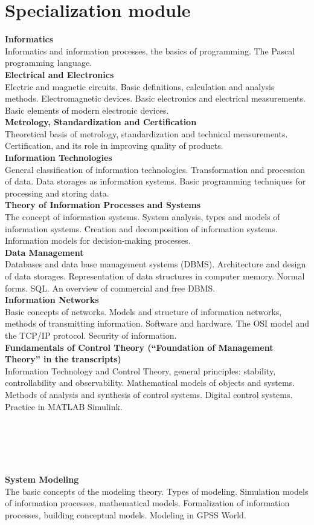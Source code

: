 \documentclass[a4paper, 12pt]{article}
\newcommand{\group}[1] {\section{#1}}
\newcommand{\discipline}[1] {\textbf{#1} \\ }
\newcommand{\desc}[1] { #1 \\ }
\begin{document}
\group{Specialization module}

\discipline{Informatics}
\desc{Informatics and information processes, the basics of programming. The Pascal programming language.}

\discipline{Electrical and Electronics}
\desc{Electric and magnetic circuits. Basic definitions, calculation and analysis methods. Electromagnetic devices. Basic electronics and electrical measurements. Basic elements of modern electronic devices.}

\discipline{Metrology, Standardization and Certification}
\desc{Theoretical basis of metrology, standardization and technical measurements. Certification, and its role in improving quality of products.}

\discipline{Information Technologies}
\desc{General classification of information technologies. Transformation and procession of data. Data storages as information systems. Basic programming techniques for processing and storing data.}

\discipline{Theory of Information Processes and Systems}
\desc{The concept of information systems. System analysis, types and models of information systems. Creation and decomposition of information systems. Information models for decision-making processes.}

\discipline{Data Management}
\desc{Databases and data base management systems (DBMS). Architecture and design of data storages. Representation of data structures in computer memory. Normal forms. SQL. An overview of commercial and free DBMS.}

\discipline{Information Networks}
\desc{Basic concepts of networks. Models and structure of information networks, methods of transmitting information. Software and hardware. The OSI model and the TCP/IP protocol. Security of information.}

\discipline{Fundamentals of Control Theory (``Foundation of Management Theory'' in the transcripts)}
\desc{Information Technology and Control Theory, general principles: stability, controllability and observability. Mathematical models of objects and systems. Methods of analysis and synthesis of control systems. Digital control systems. Practice in MATLAB Simulink.}

\

\

\

\discipline{System Modeling}
\desc{The basic concepts of the modeling theory. Types of modeling. Simulation models of information processes, mathematical models. Formalization of information processes, building conceptual models. Modeling in GPSS World.}
\end{document}
